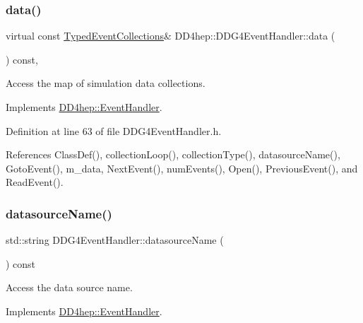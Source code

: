 \subsubsection{\texorpdfstring{data()}{data()}}
{\footnotesize\ttfamily virtual const \hyperlink{class_d_d4hep_1_1_event_handler_a4d441ff8a824b1e2f278e8b7a6391af3}{Typed\+Event\+Collections}\& D\+D4hep\+::\+D\+D\+G4\+Event\+Handler\+::data (\begin{DoxyParamCaption}{ }\end{DoxyParamCaption}) const\hspace{0.3cm}{\ttfamily [inline]}, {\ttfamily [virtual]}}



Access the map of simulation data collections. 



Implements \hyperlink{class_d_d4hep_1_1_event_handler_a263d136331d72994bcbf537d4aa16d4f}{D\+D4hep\+::\+Event\+Handler}.



Definition at line 63 of file D\+D\+G4\+Event\+Handler.\+h.



References Class\+Def(), collection\+Loop(), collection\+Type(), datasource\+Name(), Goto\+Event(), m\+\_\+data, Next\+Event(), num\+Events(), Open(), Previous\+Event(), and Read\+Event().

\hypertarget{class_d_d4hep_1_1_d_d_g4_event_handler_a8447b4fc24290d4f1539fbda65a0cbf3}{}\label{class_d_d4hep_1_1_d_d_g4_event_handler_a8447b4fc24290d4f1539fbda65a0cbf3} 
\subsubsection{\texorpdfstring{datasource\+Name()}{datasourceName()}}
{\footnotesize\ttfamily std\+::string D\+D\+G4\+Event\+Handler\+::datasource\+Name (\begin{DoxyParamCaption}{ }\end{DoxyParamCaption}) const\hspace{0.3cm}{\ttfamily [virtual]}}



Access the data source name. 



Implements \hyperlink{class_d_d4hep_1_1_event_handler_a5fa231363a787ba7edf520b5a99f294e}{D\+D4hep\+::\+Event\+Handler}.



